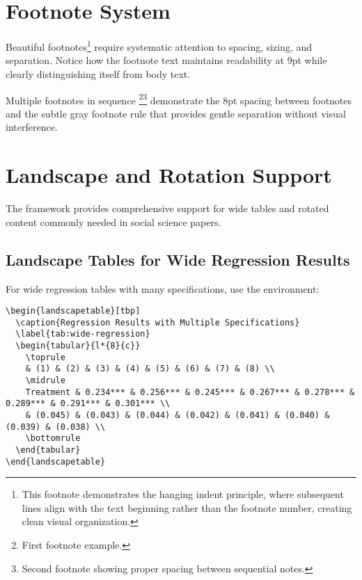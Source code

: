 \documentclass[11pt]{article}
\begin{document}
\section{Footnote System}

Beautiful footnotes\footnote{This footnote demonstrates the hanging indent principle, where subsequent lines align with the text beginning rather than the footnote number, creating clean visual organization.} require systematic attention to spacing, sizing, and separation. Notice how the footnote text maintains readability at 9pt while clearly distinguishing itself from body text.

Multiple footnotes in sequence \footnote{First footnote example.}\footnote{Second footnote showing proper spacing between sequential notes.} demonstrate the 8pt spacing between footnotes and the subtle gray footnote rule that provides gentle separation without visual interference.

\section{Landscape and Rotation Support}

The framework provides comprehensive support for wide tables and rotated content commonly needed in social science papers.

\subsection{Landscape Tables for Wide Regression Results}

For wide regression tables with many specifications, use the  environment:

\begin{verbatim}
\begin{landscapetable}[tbp]
  \caption{Regression Results with Multiple Specifications}
  \label{tab:wide-regression}
  \begin{tabular}{l*{8}{c}}
    \toprule
    & (1) & (2) & (3) & (4) & (5) & (6) & (7) & (8) \\
    \midrule
    Treatment & 0.234*** & 0.256*** & 0.245*** & 0.267*** & 0.278*** & 0.289*** & 0.291*** & 0.301*** \\
    & (0.045) & (0.043) & (0.044) & (0.042) & (0.041) & (0.040) & (0.039) & (0.038) \\
    \bottomrule
  \end{tabular}
\end{landscapetable}
\end{verbatim}
\end{document}
